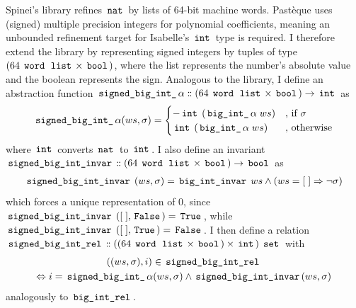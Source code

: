 Spinei's library refines $\,\text{\ttfamily nat}\,$ by lists of 64-bit machine words.
Pastèque uses (signed) multiple precision integers for polynomial coefficients, meaning an unbounded refinement target for Isabelle's $\,\text{\ttfamily int}\,$ type is required.
I therefore extend the library by representing signed integers by tuples of type $(64 \; \,\text{\ttfamily word}\, \; \,\text{\ttfamily list}\, \times \,\text{\ttfamily bool}\,)$, where the list represents the number's absolute value and the boolean represents the sign.
Analogous to the library, I define an abstraction function $\,\text{\ttfamily signed\_big\_int\_}\,\alpha \mathrel{\mathord{:}\mkern-1.2mu\mathord{:}} (64 \; \,\text{\ttfamily word}\, \; \,\text{\ttfamily list}\, \times \,\text{\ttfamily bool}\,) \rightarrow \,\text{\ttfamily int}\,$ as
\begin{gather*}
	\,\text{\ttfamily signed\_big\_int\_}\,\alpha (ws,\sigma) =
	\begin{cases}
		- \,\text{\ttfamily int}\, \; (\,\text{\ttfamily big\_int\_}\,\alpha \; ws) & \text{, if $\sigma$} \\
		\,\text{\ttfamily int}\, \; (\,\text{\ttfamily big\_int\_}\,\alpha \; ws)   & \text{, otherwise}
	\end{cases}
\end{gather*}
where $\,\text{\ttfamily int}\,$ converts $\,\text{\ttfamily nat}\,$ to $\,\text{\ttfamily int}\,$.
I also define an invariant $\,\text{\ttfamily signed\_big\_int\_invar}\, \mathrel{\mathord{:}\mkern-1.2mu\mathord{:}} (64 \; \,\text{\ttfamily word}\, \; \,\text{\ttfamily list}\, \times \,\text{\ttfamily bool}\,) \rightarrow \,\text{\ttfamily bool}\,$ as
\begin{gather*}
	\,\text{\ttfamily signed\_big\_int\_invar}\, \; (ws,\sigma) = \,\text{\ttfamily big\_int\_invar}\, \; ws \land (ws=[ \; ] \Rightarrow \lnot \sigma)
\end{gather*}
which forces a unique representation of 0, since $\,\text{\ttfamily signed\_big\_int\_invar}\, \; ([ \; ],\,\text{\ttfamily False}\,) = \,\text{\ttfamily True}\,$, while $\,\text{\ttfamily signed\_big\_int\_invar}\, \; ([ \; ], \,\text{\ttfamily True}\,) = \,\text{\ttfamily False}\,$.
I then define a relation $\,\text{\ttfamily signed\_big\_int\_rel}\, \mathrel{\mathord{:}\mkern-1.2mu\mathord{:}} ((64 \; \,\text{\ttfamily word}\, \; \,\text{\ttfamily list}\, \times \,\text{\ttfamily bool}\,) \times \,\text{\ttfamily int}\,) \; \,\text{\ttfamily set}\,$ with
\begin{gather*}
	((ws,\sigma),i) \in \,\text{\ttfamily signed\_big\_int\_rel}\, \\
	\Leftrightarrow i = \,\text{\ttfamily signed\_big\_int\_}\,\alpha (ws,\sigma) \land \,\text{\ttfamily signed\_big\_int\_invar}\, (ws,\sigma)
\end{gather*}
analogously to $\,\text{\ttfamily big\_int\_rel}\,$.

